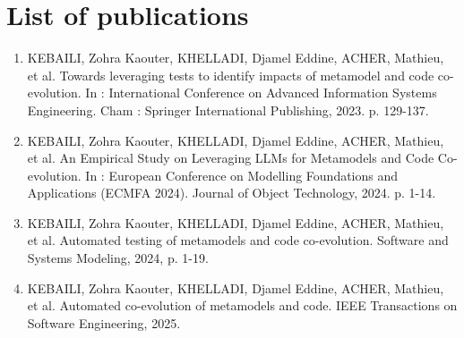 \section{List of publications}

\begin{enumerate}
	\item KEBAILI, Zohra Kaouter, KHELLADI, Djamel Eddine, ACHER, Mathieu, et al. Towards leveraging tests to identify impacts of metamodel and code co-evolution. In : International Conference on Advanced Information Systems Engineering. Cham : Springer International Publishing, 2023. p. 129-137.
	
	\item	KEBAILI, Zohra Kaouter, KHELLADI, Djamel Eddine, ACHER, Mathieu, et al. An Empirical Study on Leveraging LLMs for Metamodels and Code Co-evolution. In : European Conference on Modelling Foundations and Applications (ECMFA 2024). Journal of Object Technology, 2024. p. 1-14.
	
	\item	KEBAILI, Zohra Kaouter, KHELLADI, Djamel Eddine, ACHER, Mathieu, et al. Automated testing of metamodels and code co-evolution. Software and Systems Modeling, 2024, p. 1-19.
	
	\item	KEBAILI, Zohra Kaouter, KHELLADI, Djamel Eddine, ACHER, Mathieu, et al. Automated co-evolution of metamodels and code. IEEE Transactions on Software Engineering, 2025.
	
\end{enumerate}



